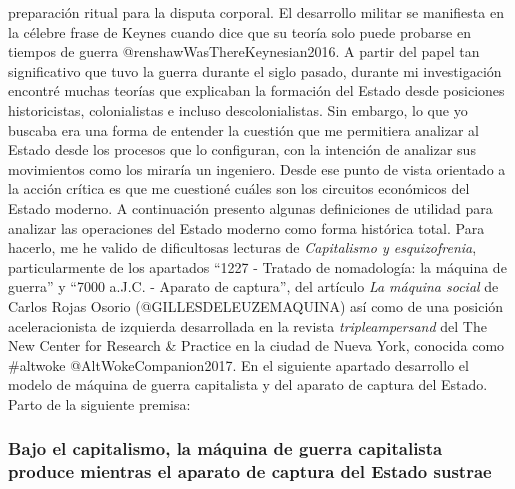 \documentclass[
]{article}
\begin{document}
preparación ritual para la disputa corporal. El desarrollo militar se
manifiesta en la célebre frase de Keynes cuando dice que su teoría solo
puede probarse en tiempos de guerra @renshawWasThereKeynesian2016. A
partir del papel tan significativo que tuvo la guerra durante el siglo
pasado, durante mi investigación encontré muchas teorías que explicaban
la formación del Estado desde posiciones historicistas, colonialistas e
incluso descolonialistas. Sin embargo, lo que yo buscaba era una forma
de entender la cuestión que me permitiera analizar al Estado desde los
procesos que lo configuran, con la intención de analizar sus movimientos
como los miraría un ingeniero. Desde ese punto de vista orientado a la
acción crítica es que me cuestioné cuáles son los circuitos económicos
del Estado moderno. A continuación presento algunas definiciones de
utilidad para analizar las operaciones del Estado moderno como forma
histórica total. Para hacerlo, me he valido de dificultosas lecturas de
\emph{Capitalismo y esquizofrenia}, particularmente de los apartados
``1227 - Tratado de nomadología: la máquina de guerra'' y ``7000 a.J.C.
- Aparato de captura'', del artículo \emph{La máquina social} de Carlos
Rojas Osorio (@GILLESDELEUZEMAQUINA) así como de una posición
aceleracionista de izquierda desarrollada en la revista
\emph{tripleampersand} del The New Center for Research \& Practice en la
ciudad de Nueva York, conocida como \#altwoke @AltWokeCompanion2017. En
el siguiente apartado desarrollo el modelo de máquina de guerra
capitalista y del aparato de captura del Estado. Parto de la siguiente
premisa:

\hypertarget{bajo-el-capitalismo-la-muxe1quina-de-guerra-capitalista-produce-mientras-el-aparato-de-captura-del-estado-sustrae}{%
\subsubsection{Bajo el capitalismo, la máquina de guerra capitalista
produce mientras el aparato de captura del Estado
sustrae}\label{bajo-el-capitalismo-la-muxe1quina-de-guerra-capitalista-produce-mientras-el-aparato-de-captura-del-estado-sustrae}}
\end{document}

